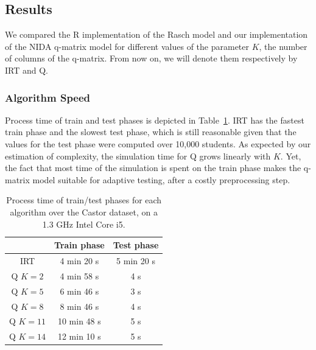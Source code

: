 \documentclass{edm_template}
\begin{document}
\subsection{Results}

We compared the R implementation of the Rasch model and our implementation of the NIDA q-matrix model for different values of the parameter $K$, the number of columns of the q-matrix. From now on, we will denote them respectively by IRT and Q.

\subsubsection{Algorithm Speed}

Process time of train and test phases is depicted in Table~\ref{tab:time}. IRT has the fastest train phase and the slowest test phase, which is still reasonable given that the values for the test phase were computed over 10,000 students. As expected by our estimation of complexity, the simulation time for Q grows linearly with $K$. Yet, the fact that most time of the simulation is spent on the train phase makes the q-matrix model suitable for adaptive testing, after a costly preprocessing step.

\begin{table}[H]
\centering\begin{tabular}{@{}c|cc@{}}
& Train phase & Test phase\\
\hline
IRT & 4 min 20 s & 5 min 20 s\\%
Q $K = 2$ & 4 min 58 s & 4 s\\
Q $K = 5$ & 6 min 46 s & 3 s\\
Q $K = 8$ & 8 min 46 s & 4 s\\ %
Q $K = 11$ & 10 min 48 s & 5 s\\ %
Q $K = 14$ & 12 min 10 s & 5 s\\ %
\end{tabular}
\caption{Process time of train/test phases for each algorithm over the Castor dataset, on a 1.3 GHz Intel Core i5.}
\label{tab:time}
\end{table}
\end{document}

